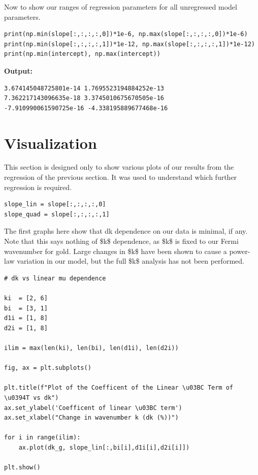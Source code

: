 \documentclass{article}
\begin{document}
Now to show our ranges of regression parameters for all unregressed model parameters.

\begin{lstlisting}
print(np.min(slope[:,:,:,:,0])*1e-6, np.max(slope[:,:,:,:,0])*1e-6)
print(np.min(slope[:,:,:,:,1])*1e-12, np.max(slope[:,:,:,:,1])*1e-12)
print(np.min(intercept), np.max(intercept))\end{lstlisting}

\textbf{Output:}\begin{verbatim}
3.674145048725801e-14 1.7695523194884252e-13
7.362217143096635e-18 3.3745010675670505e-16
-7.910990061590725e-16 -4.338195889677468e-16

\end{verbatim}

\section{Visualization}

This section is designed only to show various plots of our results from the regression of the previous section. It was used to understand which further regression is required.

\begin{lstlisting}
slope_lin = slope[:,:,:,:,0]
slope_quad = slope[:,:,:,:,1]\end{lstlisting}

The first graphs here show that dk dependence on our data is minimal, if any. Note that this says nothing of \$k\$ dependence, as \$k\$ is fixed to our Fermi wavenumber for gold. Large changes in \$k\$ have been shown to cause a power-law variation in our model, but the full \$k\$ analysis has not been performed.

\begin{lstlisting}
# dk vs linear mu dependence

ki  = [2, 6]
bi  = [3, 1]
d1i = [1, 8]
d2i = [1, 8]

ilim = max(len(ki), len(bi), len(d1i), len(d2i))

fig, ax = plt.subplots()

plt.title(f"Plot of the Coefficent of the Linear \u03BC Term of \u0394T vs dk")
ax.set_ylabel('Coefficent of linear \u03BC term')
ax.set_xlabel("Change in wavenumber k (dk (%))")

for i in range(ilim):
    ax.plot(dk_g, slope_lin[:,bi[i],d1i[i],d2i[i]])

plt.show()\end{lstlisting}
\end{document}
